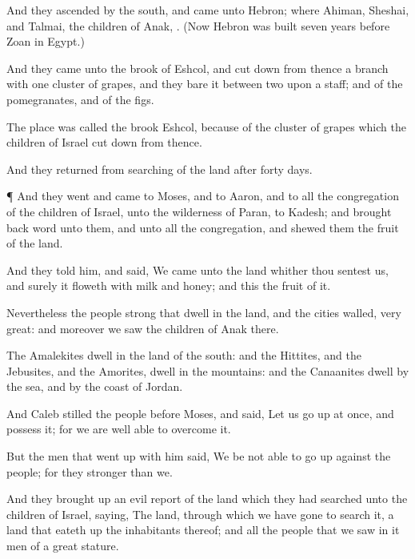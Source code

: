 {And they
ascended by the
south, and
came unto
Hebron; where
Ahiman,
Sheshai, and
Talmai, the
children of
Anak,
{}. (Now
Hebron was
built
seven
years
before
Zoan in
Egypt.)

And they
came unto the
brook of
Eshcol, and cut
down from thence a
branch with
one
cluster of
grapes, and they
bare it between
two upon a
staff; and
{} of the
pomegranates, and of the
figs.

The
place was
called the
brook
Eshcol, because
of the cluster of
grapes which the
children of
Israel cut
down from thence.

And they
returned from
searching of the
land
after
forty
days.


\par }{\PP {}¶ And they
went and
came to
Moses, and to
Aaron, and to all the
congregation of the
children of
Israel, unto the
wilderness of
Paran, to
Kadesh; and brought
back
word unto them, and unto all the
congregation, and
shewed them the
fruit of the
land.

And they
told him, and
said, We
came unto the
land whither thou
sentest us, and surely it
floweth with
milk and
honey; and this
{} the
fruit of it.

Nevertheless the
people
{}
strong that
dwell in the
land, and the
cities
{}
walled,
{}
very
great: and moreover we
saw the
children of
Anak there.

The
Amalekites
dwell in the
land of the
south: and the
Hittites, and the
Jebusites, and the
Amorites,
dwell in the
mountains: and the
Canaanites
dwell by the
sea, and by the
coast of
Jordan.

And
Caleb
stilled the
people before
Moses, and
said, Let us go
up at
once, and
possess it; for we are well
able to
overcome it.

But the
men that went
up with him
said, We be not
able to go
up against the
people; for they
{}
stronger than we.

And they brought
up an evil
report of the
land which they had
searched unto the
children of
Israel,
saying, The
land, through which we have
gone to
search it,
{} a
land that eateth
up the
inhabitants thereof; and all the
people that we
saw in
it
{}
men of a great
stature.

}
